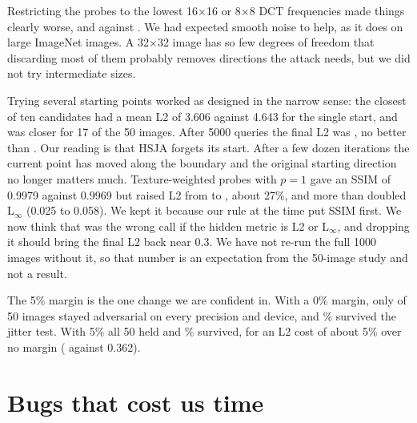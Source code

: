 \documentclass[11pt]{article}
\begin{document}
\begin{table}[tbp]
\centering
\small
\tabStudy
\caption{The ablation study. Success was 100\% in every row. Low-frequency probes and the multi-start variant make L2 worse or no better. Texture weighting raises SSIM by 0.001 and costs L2. The margin trades a little L2 for a large gain in robustness.}
\label{tab:study}
\end{table}

Restricting the probes to the lowest 16$\times$16 or 8$\times$8 DCT frequencies made things clearly worse, \nLowA{} and \nLowB{} against \nStudyBaseLc. We had expected smooth noise to help, as it does on large ImageNet images. A 32$\times$32 image has so few degrees of freedom that discarding most of them probably removes directions the attack needs, but we did not try intermediate sizes.

Trying several starting points worked as designed in the narrow sense: the closest of ten candidates had a mean L2 of 3.606 against 4.643 for the single start, and was closer for 17 of the 50 images. After 5000 queries the final L2 was \nMulti, no better than \nStudyBaseLc. Our reading is that HSJA forgets its start. After a few dozen iterations the current point has moved along the boundary and the original starting direction no longer matters much.
Texture-weighted probes with $p=1$ gave an SSIM of 0.9979 against 0.9969 but raised L2 from \nStudyBaseLc{} to \nTexB, about 27\%, and more than doubled L$_\infty$ (0.025 to 0.058). We kept it because our rule at the time put SSIM first. We now think that was the wrong call if the hidden metric is L2 or L$_\infty$, and dropping it should bring the final L2 back near 0.3. We have not re-run the full 1000 images without it, so that number is an expectation from the 50-image study and not a result.

The 5\% margin is the one change we are confident in. With a 0\% margin, only \nMarginZeroHolds{} of 50 images stayed adversarial on every precision and device, and \nMarginZeroJit\% survived the jitter test. With 5\% all 50 held and \nMarginFiveJit\% survived, for an L2 cost of about 5\% over no margin (\nMarginFiveLc{} against 0.362).

\section{Bugs that cost us time}
\end{document}
